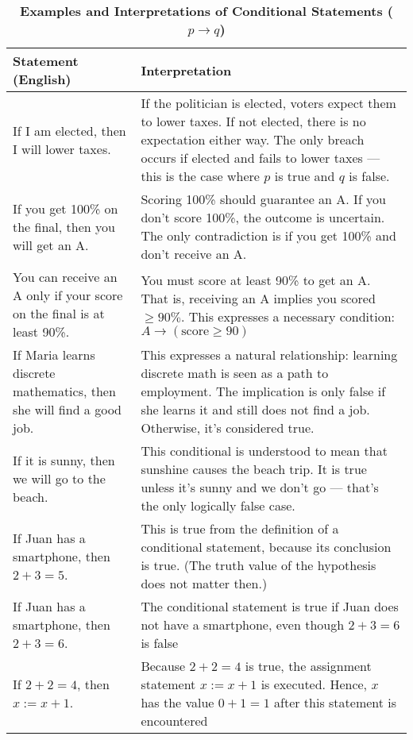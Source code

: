 \newpage
\begin{table}[h!]
\centering
\caption*{\textbf{Examples and Interpretations of Conditional Statements ($p \rightarrow q$)}}
\begin{tabular}{|
    >{\centering\arraybackslash}m{7cm}  %
    |m{7.5cm}|}  %
\hline
\rowcolor{gray!20}
\textbf{Statement (English)} & \textbf{Interpretation} \\
\hline
If I am elected, then I will lower taxes. & If the politician is elected, voters expect them to lower taxes. If not elected, there is no expectation either way. The only breach occurs if elected and fails to lower taxes — this is the case where $p$ is true and $q$ is false. \\
\hline
If you get 100\% on the final, then you will get an A. & Scoring 100\% should guarantee an A. If you don’t score 100\%, the outcome is uncertain. The only contradiction is if you get 100\% and don’t receive an A. \\
\hline
You can receive an A only if your score on the final is at least 90\%. & You must score at least 90\% to get an A. That is, receiving an A implies you scored $\geq 90\%$. This expresses a necessary condition: $A \rightarrow (\text{score} \geq 90)$ \\
\hline
If Maria learns discrete mathematics, then she will find a good job. &  This expresses a natural relationship: learning discrete math is seen as a path to employment. The implication is only false if she learns it and still does not find a job. Otherwise, it's considered true. \\
\hline
If it is sunny, then we will go to the beach. & This conditional is understood to mean that sunshine causes the beach trip. It is true unless it’s sunny and we don’t go — that’s the only logically false case. \\
\hline
If Juan has a smartphone, then $2 + 3 = 5$. &  This is true from the definition of a conditional statement, because its conclusion is true. (The truth
value of the hypothesis does not matter then.) \\
\hline
If Juan has a smartphone, then $2 + 3 = 6$. & The conditional statement is true if Juan does not have a smartphone, even though $2 + 3 = 6$ is false\\
\hline
If $2 + 2 = 4$, then $x := x + 1$. & Because $2 + 2 = 4$ is true, the assignment statement $x := x + 1$ is executed. Hence, $x$
has the value $0 + 1 = 1$ after this statement is encountered\\
\hline
\end{tabular}
\end{table}
